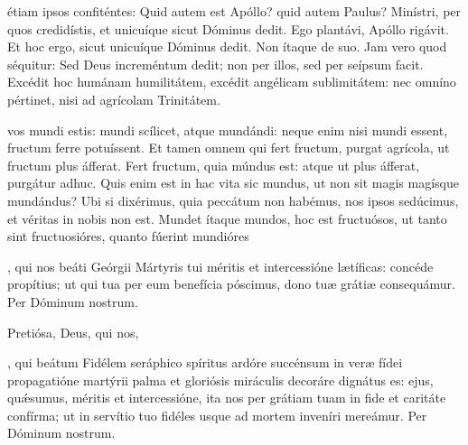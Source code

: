 \documentclass[fontsize=9pt,paper=A6,twoside,BCOR=1mm,DIV=22,headinclude]{scrarticle}
\begin{document}
\begin{multicols}{2}
\RVMTPvii 

 étiam ipsos confiténtes: Quid autem est Apóllo? quid autem Paulus? Minístri, per quos credidístis, et unicuíque sicut Dóminus dedit. Ego plantávi, Apóllo rigávit. Et hoc ergo, sicut unicuíque Dóminus dedit. Non ítaque de suo. Jam vero quod séquitur: Sed Deus increméntum dedit; non per illos, sed per seípsum facit. Excédit hoc humánam humilitátem, excédit angélicam sublimitátem: nec omníno pértinet, nisi ad agrícolam Trinitátem.

\RVMTPviii 

 vos mundi estis: mundi scílicet, atque mundándi: neque enim nisi mundi essent, fructum ferre potuíssent. Et tamen omnem qui fert fructum, purgat agrícola, ut fructum plus áfferat. Fert fructum, quia múndus est: atque ut plus áfferat, purgátur adhuc. Quis enim est in hac vita sic mundus, ut non sit magis magísque mundándus? Ubi si dixérimus, quia peccátum non habémus, nos ipsos sedúcimus, et véritas in nobis non est. Mundet ítaque mundos, hoc est fructuósos, ut tanto sint fructuosióres, quanto fúerint mundióres

\Te 


\VRMTPii 

\BMTP 

\columnbreak
{}
, qui nos beáti Geórgii Mártyris tui méritis et intercessióne lætíficas: concéde propítius; ut qui tua per eum benefícia póscimus, dono tuæ grátiæ consequámur. Per Dóminum nostrum.


\AiiiMTP 

\V Pretiósa,  Deus, qui nos, 


\AiMTP 

\VRMTPi 

, qui beátum Fidélem seráphico spíritus ardóre succénsum in veræ fídei propagatióne martýrii palma et gloriósis miráculis decoráre dignátus es: ejus, qu\'æsumus, méritis et intercessióne, ita nos per grátiam tuam in fide et caritáte confírma; ut in servítio tuo fidéles usque ad mortem inveníri mereámur. Per Dóminum nostrum.





\end{multicols}
\end{document}
